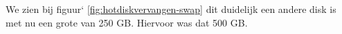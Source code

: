 We zien bij figuur` \ref{fig:hotdiskvervangen-swap} dit duidelijk een andere disk is met nu een grote van 250 GB. Hiervoor was dat 500 GB.

